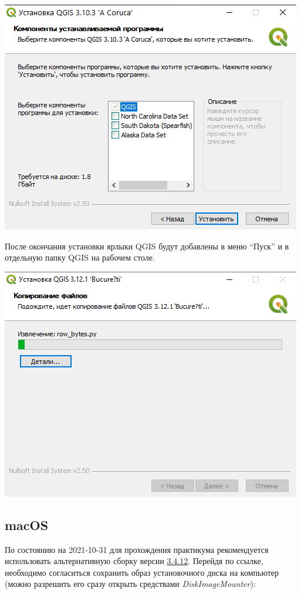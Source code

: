 \documentclass[
  12pt,
]{book}
\begin{document}
\includegraphics{images/installation_instruction_win/win04.png}

После окончания установки ярлыки QGIS будут добавлены в меню ``Пуск'' и в отдельную папку QGIS на рабочем столе.

\includegraphics{images/installation_instruction_win/win05.png}

\hypertarget{macos}{%
\subsection*{macOS}\label{macos}}

По состоянию на 2021-10-31 для прохождения практикума рекомендуется использовать альтернативную сборку версии \href{https://www.kyngchaos.com/files/software/qgis/QGIS-macOS-3.4.12-1.dmg}{3.4.12}. Перейдя по ссылке, необходимо согласиться сохранить образ установочного диска на компьютер (можно разрешить его сразу открыть средствами \emph{DiskImageMounter}):
\end{document}
